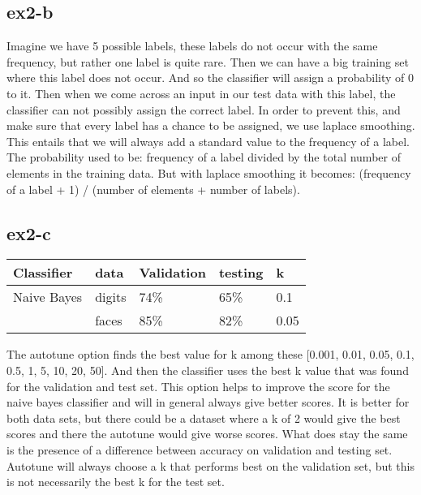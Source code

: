 \subsection{ex2-b}
Imagine we have 5 possible labels, these labels do not occur with the same frequency, but rather
one label is quite rare. Then we can have a big training set where this label does not occur. 
And so the classifier will assign a probability of 0 to it. Then when we come across an input
in our test data with this label, the classifier can not possibly assign the correct label.
In order to prevent this, and make sure that every label has a chance to be assigned, we use 
laplace smoothing. 
This entails that we will always add a  standard value to the frequency of a label. 
The probability used to be: frequency of a label divided by the total number of elements 
in the training data. But with laplace smoothing it becomes: (frequency of a label + 1) /
 (number of elements + number of labels).

\subsection{ex2-c}
\begin{table}[!htbp]
\centering
\begin{tabular}{|l|l||l|l||l|}
\hline
Classifier    & data   & Validation & testing & k \\ \hline
Naive Bayes   & digits & 74\%       & 65\%    & 0.1 \\ 
              & faces  & 85\%       & 82\%    & 0.05 \\ \hline
\end{tabular}
\end{table}

The autotune option finds the best value for k among these [0.001, 0.01, 0.05, 0.1, 0.5, 
1, 5, 10, 20, 50]. And then the classifier uses the best k value that was found for the
validation and test set. 
This option helps to improve the score for the naive bayes classifier and will in general 
always give better scores. It is better for both data sets, but there could be a dataset 
where a k of 2 would give the best scores and there the autotune would give worse scores.
What does stay the same is the presence of a difference between accuracy on validation and 
testing set. Autotune will always choose a k that performs best on the validation set, 
but this is not necessarily the best k for the test set.

